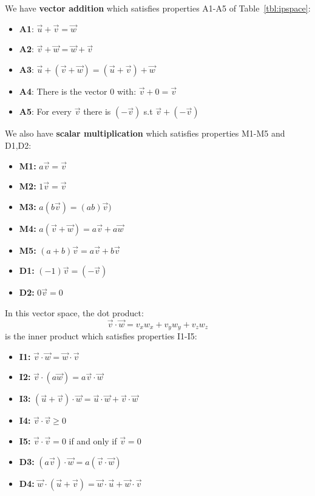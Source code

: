 \documentclass[12pt]{book}
\begin{document}
\begin{samepage}
\noindent
We have {\bf vector addition} which satisfies properties A1-A5 of Table~\ref{tbl:ipspace}:
\begin{itemize}
\item {\bf A1}: $\vec{u} + \vec{v} = \vec{w}$ 
\item {\bf A2}: $\vec{v} + \vec{w} = \vec{w} + \vec{v}$
\item {\bf A3}: $\vec{u} + (\vec{v} + \vec{w}) = (\vec{u} + \vec{v}) + \vec{w} $
\item {\bf A4}: There is the vector 0 with: $\vec{v} + 0 = \vec{v} $
\item {\bf A5}: For every $\vec{v}$ there is $(-\vec{v})$ s.t $\vec{v} + (-\vec{v})$
\end{itemize}
\end{samepage}

\begin{samepage}
\noindent
We also have {\bf scalar multiplication} which satisfies properties M1-M5 and D1,D2:
\begin{itemize}
\item {\bf M1:} $a \vec{v} = \vec{v}$
\item {\bf M2:} $1 \vec{v} = \vec{v}$
\item {\bf M3:} $a(b\vec{v}) = (ab)\vec{v})$
\item {\bf M4:} $a(\vec{v} + \vec{w}) = a\vec{v} + a\vec{w}$
\item {\bf M5:} $(a+b)\vec{v} = a\vec{v} + b\vec{v}$
\item {\bf D1:} $(-1)\vec{v} = (-\vec{v})$
\item {\bf D2:} $0\vec{v} = 0$
\end{itemize}
\end{samepage}

\noindent
In this vector space, the dot product:
\begin{displaymath}
\vec{v} \cdot \vec{w} = v_x w_x + v_y w_y + v_z w_z 
\end{displaymath}
is the inner product which satisfies properties I1-I5:
\begin{itemize}
\item {\bf I1:} $\vec{v} \cdot \vec{w} = \vec{w} \cdot \vec{v}$
\item {\bf I2:} $\vec{v} \cdot \left(a\vec{w}\right) = a \vec{v} \cdot \vec{w}$
\item {\bf I3:} $\left(\vec{u} + \vec{v}\right) \cdot \vec{w} = \vec{u} \cdot \vec{w} + \vec{v} \cdot \vec{w} $
\item {\bf I4:} $\vec{v} \cdot \vec{v} \geq 0$
\item {\bf I5:} $\vec{v} \cdot \vec{v} = 0$ if and only if $\vec{v} = 0$
\item {\bf D3:} $\left(a\vec{v}\right) \cdot \vec{w} = a \left( \vec{v} \cdot \vec{w}\right) $
\item {\bf D4:} $\vec{w} \cdot \left(\vec{u} + \vec{v}\right)  = \vec{w} \cdot \vec{u} + \vec{w} \cdot \vec{v}$
\end{itemize}
\end{document}
